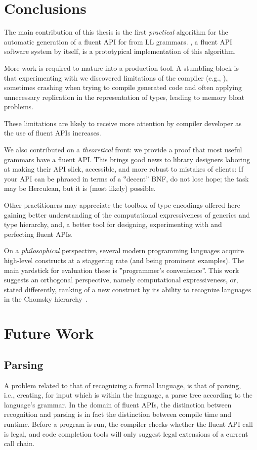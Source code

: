 \section{Conclusions}
The main contribution of this thesis is the first \emph{practical} algorithm for the
automatic generation of a fluent API for \Java from LL grammars.  \Fajita, a
fluent API software system by itself, is a prototypical implementation of this
algorithm. 

More work is required to mature \Fajita into a production tool. A stumbling
block is that experimenting with \Fajita we discovered limitations of the \Java
compiler (e.g., ), sometimes crashing when trying to compile
\Fajita generated code and often applying unnecessary replication in the
representation of types, leading to memory bloat problems.

These limitations are likely to receive more attention by compiler developer as
the use of fluent APIs increases. 


We also contributed on a \emph{theoretical} front: we provide a proof that most useful
grammars have a fluent API\@.  This brings good news to library designers
laboring at making their API slick, accessible, and more robust to mistakes of
clients: If your API can be phrased in terms of a ‟decent” BNF, do not lose
hope; the task may be Herculean, but it is (most likely) possible.

Other practitioners may appreciate the toolbox of type encodings offered here
  gaining better understanding of the computational expressiveness of
  \Java generics and type hierarchy, and, a better tool
  for designing, experimenting with and perfecting fluent APIs.

On a \emph{philosophical} perspective, several modern programming languages acquire
high-level constructs at a staggering rate (\CC and \Scala being prominent
examples).  The main yardstick for evaluation these is ‟programmer's
convenience”.  This work suggests an orthogonal perspective, namely
computational expressiveness, or, stated differently, ranking of a new
construct by its ability to recognize languages in the Chomsky
hierarchy~\cite{Chomsky:1963}.


\section{Future Work}
\subsection{Parsing}
A problem related to that of recognizing a formal language, is that of parsing,
i.e., creating, for input which is within the language, a parse tree according
to the language's grammar.  In the domain of fluent APIs, the distinction
between recognition and parsing is in fact the distinction between compile time
and runtime.  Before a program is run, the compiler checks whether the fluent
API call is legal, and code completion tools will only suggest legal extensions
of a current call chain.

